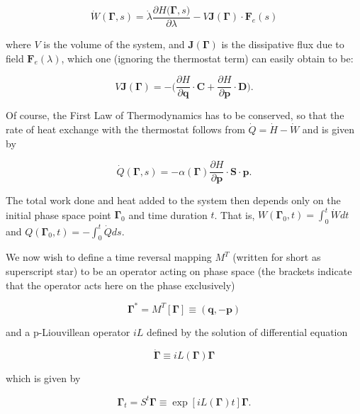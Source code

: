 \documentclass[a4paper,12pt]{article}
\begin{document}
\begin{equation}
  \dot{W}(\bm{\Gamma},s) = \dot{\lambda} \frac{\partial{H(\bm{\Gamma}},s)}{\partial{\lambda}} - V \bm{J}(\bm{\Gamma})\cdot \bm{F}_e(s)
\end{equation}

where $V$ is the volume of the system, and $\bm{J}(\bm{\Gamma})$ is the dissipative flux due to field $\bm{F}_e(\lambda)$, which one (ignoring the thermostat term) can easily obtain to be:

\begin{equation}
  V \bm{J}(\bm{\Gamma}) = -\Big(\frac{\partial{H}}{\partial{\bm{q}}}\cdot \bm{C}+\frac{\partial{H}}{\partial{\bm{p}}}\cdot \bm{D}\Big).
\end{equation}

Of course, the First Law of Thermodynamics has to be conserved, so that the rate of heat exchange with the thermostat follows from $\dot{Q}=\dot{H}-\dot{W}$ and is given by

\begin{equation}
  \dot{Q}(\bm{\Gamma},s)= -\alpha(\bm{\Gamma})\frac{\partial{H}}{\partial{\bm{p}}}\cdot \bm{S}\cdot \bm{p}.
\end{equation}

The total work done and heat added to the system then depends only on the initial phase space point $\bm{\Gamma}_0$ and time duration $t$. That is, $W(\bm{\Gamma}_0,t)=\int_0^t \dot{W} dt$ and $Q(\bm{\Gamma}_0,t)=-\int_0^t \dot{Q} ds$.

We now wish to define a time reversal mapping $M^T$ (written for short as superscript star) to be an operator acting on phase space (the brackets indicate that the operator acts here on the phase exclusively) 

\begin{equation}
  \bm{\Gamma}^*=M^T[\bm{\Gamma}] \equiv (\bm{q},-\bm{p})
\end{equation}

and a p-Liouvillean operator $iL$ defined by the solution of differential equation 

\begin{equation}
 \dot{\bm{\Gamma}} \equiv iL(\bm{\Gamma})\bm{\Gamma}
\end{equation}

which is given by

\begin{equation}
  \bm{\Gamma}_t = S^t \bm{\Gamma} \equiv \exp[iL(\bm{\Gamma})t]\bm{\Gamma}.
\end{equation}
\end{document}
